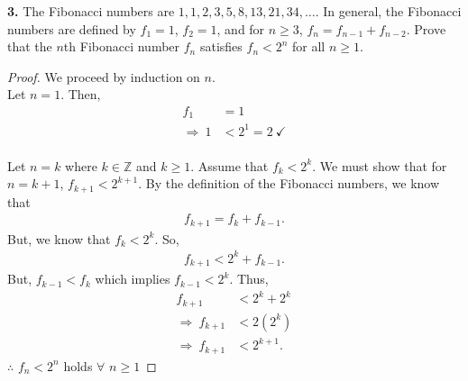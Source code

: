 \documentclass[12pt, letterpaper]{article}
\begin{document}
\textbf{3.} The Fibonacci numbers are $1,1,2,3,5,8, 13, 21, 34, \ldots$. In general, the Fibonacci numbers are defined by $f_{1} = 1$, $f_{2} = 1$, and for $n \geq 3$, $f_{n} = f_{n-1} + f_{n-2}$. Prove that the $n$th Fibonacci number $f_{n}$ satisfies $f_{n} < 2^{n}$ for all $n \geq 1$.
\begin{proof}
    We proceed by induction on $n$. \\
     Let $n=1$. Then,
    \begin{align*}
        f_{1} &= 1 \\
        \Rightarrow \ 1 &< 2^{1} = 2 \ \checkmark
    \end{align*}  \\
     Let $n=k$ where $k \in \mathbb{Z}$ and $k \geq 1$. Assume that $f_{k} < 2^{k}$. We must show that for $n = k + 1$, $f_{k+1} < 2^{k+1}$. By the definition of the Fibonacci numbers, we know that
    \begin{align*}
        f_{k + 1} = f_{k} + f_{k-1}.
    \end{align*}
    But, we know that $f_{k} < 2^{k}$. So,
    \begin{align*}
        f_{k + 1} < 2^{k} + f_{k-1}.
    \end{align*}
    But, $f_{k-1} < f_{k}$ which implies $f_{k-1} < 2^{k}$. Thus, 
    \begin{align*}
        f_{k + 1} &< 2^{k} + 2^{k} \\
        \Rightarrow \ f_{k + 1} &< 2(2^{k}) \\
        \Rightarrow \ f_{k + 1} &< 2^{k + 1}.
    \end{align*}
    $\therefore$ $f_{n} < 2^{n}$ holds $\forall$ $n \geq 1$
\end{proof}
\end{document}
